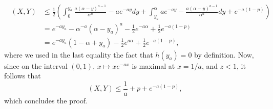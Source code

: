 \documentclass[11pt]{article}
\numberwithin{equation}{section}
\DeclareMathOperator{\tv}{d_{\mathrm{TV}}}
\theoremstyle{definition}
\begin{document}
\begin{equation*}
\begin{split}
\tv(X,Y)&\leq \frac{1}{2}\left(\int_0^{y_a} \frac{a(\alpha-y)^{a-1}}{\alpha^a} - ae^{-ay} dy + \int_{y_a}^\alpha a e^{-ay} -\frac{a(\alpha-y)^{a-1}}{\alpha^a} dy + e^{-a(1-p)}\right)\\
&= e^{-ay_a} - \alpha^{-a}(\alpha-y_a)^a - \frac{1}{2}e^{-a\alpha} +\frac{1}{2}e^{-a(1-p)} \\
&= e^{-ay_a}(1-\alpha+y_a) - \frac{1}{2}e^{a\alpha} + \frac{1}{2}e^{-a(1-p)},
\end{split}
\end{equation*}
where we used in the last equality the fact that $h(y_a)=0$ by definition. Now, since on the interval $(0,1)$, $x\mapsto xe^{-ax}$ is maximal at $x = 1/a$, and $z < 1$, it follows that
$$\tv(X,Y) \leq \frac{1}{a} + p + e^{-a(1-p)}, $$
which concludes the proof. 
\end{document}
